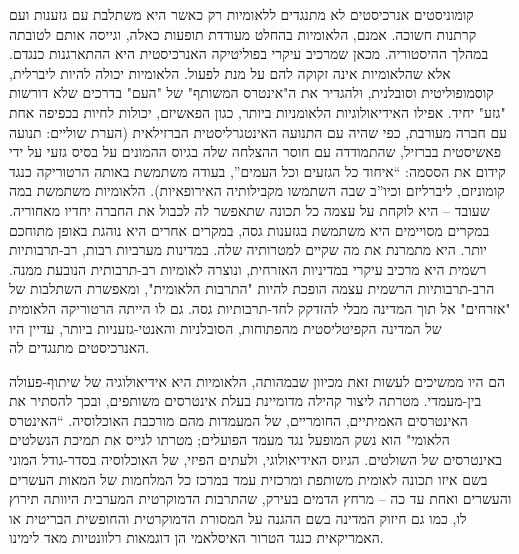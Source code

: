 קומוניסטים אנרכיסטים לא מתנגדים ללאומיות רק כאשר היא משתלבת עם גזענות ועם קרתנות חשוכה. אמנם, הלאומיות בהחלט מעודדת תופעות כאלה, וגייסה אותם לטובתה במהלך ההיסטוריה. מכאן שמרכיב עיקרי בפוליטיקה האנרכיסטית היא ההתארגנות כנגדם. אלא שהלאומיות אינה זקוקה להם על מנת לפעול. הלאומיות יכולה להיות ליברלית, קוסמופוליטית וסובלנית, ולהגדיר את ה"אינטרס המשותף" של "העם" בדרכים שלא דורשות "גזע" יחיד. אפילו האידיאולוגיות הלאומניות ביותר, כגון הפאשיזם, יכולות לחיות בכפיפה אחת עם חברה מעורבת, כפי שהיה עם התנועה האינטגרליסטית הברזילאית (הערת שוליים: תנועה פאשיסטית בברזיל, שהתמודדה עם חוסר ההצלחה שלה בגיוס ההמונים על בסיס גזעי על ידי קידום את הססמה: “איחוד כל הגזעים וכל העמים”, בעודה משתמשת באותה הרטוריקה כנגד קומוניזם, ליברליזם וכיו”ב שבה השתמשו מקבילותיה האירופאיות). הלאומיות משתמשת במה שעובד – היא לוקחת על עצמה כל תכונה שתאפשר לה לכבול את החברה יחדיו מאחוריה. במקרים מסויימים היא משתמשת בגזענות גסה, במקרים אחרים היא נוהגת באופן מתוחכם יותר. היא מתמרנת את מה שקיים למטרותיה שלה. במדינות מערביות רבות, רב-תרבותיות רשמית היא מרכיב עיקרי במדיניות האזרחית, ונוצרה לאומיות רב-תרבותית הנובעת ממנה. הרב-תרבותיות הרשמית עצמה הופכת להיות "התרבות הלאומית", ומאפשרת השתלבות של "אזרחים" אל תוך המדינה מבלי להזדקק לחד-תרבותיות גסה. גם לו הייתה הרטוריקה הלאומית של המדינה הקפיטליסטית מהפתוחות, הסובלניות והאנטי-גזעניות ביותר, עדיין היו האנרכיסטים מתנגדים לה.

הם היו ממשיכים לעשות זאת מכיוון שבמהותה, הלאומיות היא אידיאולוגיה של שיתוף-פעולה בין-מעמדי. מטרתה ליצור קהילה מדומיינת בעלת אינטרסים משותפים, ובכך להסתיר את האינטרסים האמיתיים, החומריים, של המעמדות מהם מורכבת האוכלוסיה. “האינטרס הלאומי" הוא נשק המופעל נגד מעמד הפועלים; מטרתו לגייס את תמיכת הנשלטים באינטרסים של השולטים. הגיוס האידיאולוגי, ולעתים הפיזי, של האוכלוסיה בסדר-גודל המוני בשם איזו תכונה לאומית משותפת ומרכזית עמד במרכז כל המלחמות של המאות העשרים והעשרים ואחת עד כה – מרחץ הדמים בעירק,  שהתרבות הדמוקרטית המערבית היוותה תירוץ לו, כמו גם חיזוק המדינה בשם ההגנה על המסורת הדמוקרטית והחופשית הבריטית או האמריקאית כנגד הטרור האיסלאמי הן דוגמאות רלוונטיות מאד לימינו.

